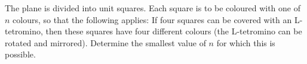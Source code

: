 The plane is divided into unit squares. Each square is to be coloured with one of $n$ colours,
so that the following applies: If four squares can be covered with an L-tetromino,
then these squares have four different colours (the L-tetromino can be rotated and mirrored).
Determine the smallest value of $n$ for which this is possible.